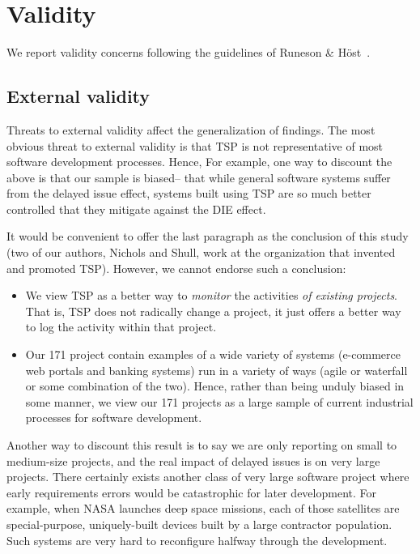 \documentclass{sig-alternate}
\newcommand{\bi}{\begin{itemize}}%
\newcommand{\ei}{\end{itemize}}
\def\baselinestretch{1}
\begin{document}
%


 


 
 

\section{Validity}
We report validity concerns following the guidelines of Runeson \& H\"{o}st~\cite{runeson09}.

\subsection{External validity}
Threats to external validity affect the generalization of findings. The most obvious threat to external validity is that TSP is not representative of most software development processes. Hence,
For example, 
one way to discount the above is that our sample is biased-- that while general software
systems suffer from the delayed issue effect, systems built using TSP are so much better controlled
that they  mitigate against the DIE effect.

It would be convenient to offer the last paragraph as the conclusion of this study
(two of our authors, Nichols and Shull,  work at the organization that invented and promoted TSP).
 However, we cannot endorse such a conclusion:
 \bi
 \item
We view TSP as a better way to
 {\em monitor} the activities {\em of  existing projects}. That is, TSP
 does not radically change a project, it just offers a better way to log the activity within
 that project. 
 \item
 Our 171 project contain examples of a wide variety
 of systems (e-commerce web portals and  banking systems) run in a variety of
 ways (agile or  waterfall or some combination of the two). Hence, rather
 than being unduly  biased in some manner,
 we view our 171 projects as a large sample of current industrial processes for software
 development.
 \ei
Another way to discount this result is to say we are only reporting on small to medium-size
projects, and the real impact of delayed issues is on very large projects.
There certainly exists another class of very large software project where early requirements
errors would be catastrophic for later development. For example, when NASA launches deep space missions,
each of those satellites are special-purpose, uniquely-built devices built by a large contractor
population. Such systems are very hard to reconfigure halfway through the development.  
\end{document}
